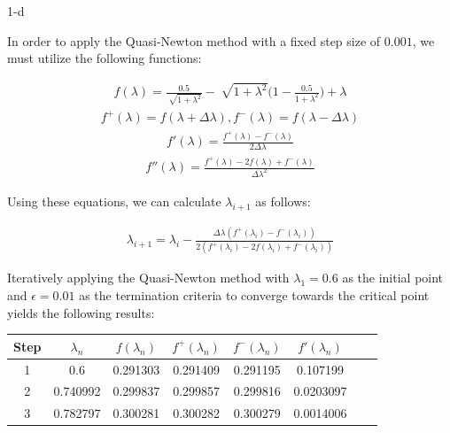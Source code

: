 \documentclass[11pt]{article}
\begin{document}
\begin{prob}{1-d}
\end{prob}
\begin{sol} 

In order to apply the Quasi-Newton method with a fixed step size of $0.001$, we must utilize the following functions:

\begin{eqnarray}
f(\lambda) = \frac{0.5}{\sqrt[]{1 + \lambda^2}} - \sqrt[]{1 + \lambda^2}\Bigg(1 - \frac{0.5}{1 + \lambda^2}\Bigg) + \lambda
\end{eqnarray}
\begin{eqnarray*}
f^{+}(\lambda) = f(\lambda + \Delta\lambda), f^-(\lambda) = f(\lambda - \Delta\lambda)
\end{eqnarray*}
\begin{eqnarray*}
f'(\lambda) = \frac{f^{+}(\lambda) - f^{-}(\lambda)}{2\Delta\lambda}
\end{eqnarray*}
\begin{eqnarray*}
f''(\lambda) = \frac{f^{+}(\lambda) - 2f(\lambda) + f^{-}(\lambda)}{\Delta\lambda^2}
\end{eqnarray*}

Using these equations, we can calculate $\lambda_{i+1}$ as follows:

\begin{eqnarray*}
\lambda_{i+1} = \lambda_{i} - \frac{\Delta\lambda(f^{+}(\lambda_i) - f^{-}(\lambda_i))}{2(f^{+}(\lambda_i) - 2f(\lambda_i) + f^{-}(\lambda_i))}
\end{eqnarray*}

Iteratively applying the Quasi-Newton method with $\lambda_1 = 0.6$ as the initial point and $\epsilon=0.01$ as the termination criteria to converge towards the critical point yields the following results:

\begin{center}
  \begin{tabular}{| c | c | c | c | c | c | c | c | }
    \hline
	Step & $\lambda_{n}$ & $f(\lambda_n)$ & $f^{+}(\lambda_n)$ & $f^{-}(\lambda_n)$ & $f'(\lambda_n)$\\ \hline
	1 & 0.6 & 0.291303 & 0.291409 & 0.291195  & 0.107199\\ \hline	
	2 & 0.740992 & 0.299837 & 0.299857 & 0.299816 & 0.0203097\\ \hline
	3 & 0.782797 & 0.300281 & 0.300282 & 0.300279 & 0.0014006 \\ \hline
  \end{tabular}
\end{center}


\end{sol}
\end{document}
